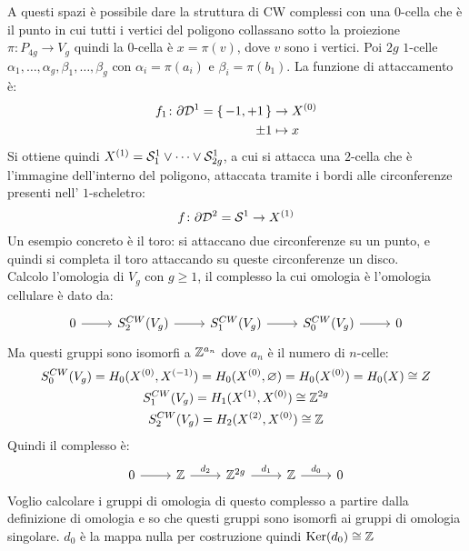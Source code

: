 A questi spazi è possibile dare la struttura di CW complessi
con una $ 0 $-cella che è il punto in cui tutti i vertici del
poligono collassano sotto la proiezione $ \pi \colon P_{4g} \to V_g $
quindi la $ 0 $-cella è $ x = \pi(v) $, dove $ v $ sono i vertici.
Poi $ 2 g $ $ 1 $-celle $ \alpha_1, \dots, \alpha_g, \beta_1, \dots, \beta_g $ con
$ \alpha_i = \pi(a_i) $ e $ \beta_i = \pi(b_1) $. La funzione di attaccamento
è:
\begin{align*}
  f_1 \colon \partial \mathcal{D}^{1} = \set{-1, +1} & \to X^{(0)} \\
  \pm 1 & \mapsto x
\end{align*}
Si ottiene quindi $ X^{(1)} = \mathcal{S}^{1}_1 \vee \dots \vee \mathcal{S}^{1}_{2g} $, a cui si attacca
una $ 2 $-cella che è l'immagine dell'interno del poligono, attaccata tramite
i bordi alle circonferenze presenti nell' $ 1 $-scheletro:
\[
  f \colon \partial \mathcal{D}^{2} = \mathcal{S}^{1} \to X^{(1)}
\]
Un esempio concreto è il toro: si attaccano due circonferenze su un punto, e
quindi si completa il toro attaccando su queste circonferenze un disco. \\
Calcolo l'omologia di $ V_g $ con $ g \geq 1 $, il complesso la cui omologia
è l'omologia cellulare è dato da:
\[
  \begin{tikzcd}
    0 \rar & S^{CW}_2(V_g) \rar & S^{CW}_1(V_g) \rar & S^{CW}_0(V_g) \rar & 0
  \end{tikzcd}
\]
Ma questi gruppi sono isomorfi a $ \mathbb{Z}^{a_n} $ dove $ a_n $ è il numero di
$ n $-celle:
\begin{gather*}
  S^{CW}_0(V_g) = H_0(X^{(0)}, X^{(-1)}) = H_0(X^{(0)}, \varnothing) = H_0(X^{(0)}) = H_0(X) \cong Z \\
  S^{CW}_1(V_g) = H_1(X^{(1)}, X^{(0)}) \cong \mathbb{Z}^{2g} \\
  S^{CW}_2(V_g) = H_2(X^{(2)}, X^{(0)}) \cong \mathbb{Z}
\end{gather*}
Quindi il complesso è:
\[
  \begin{tikzcd}
    0 \rar & \Z \rar{d_2} & \Z^{2g} \rar{d_1} & \Z \rar{d_0} & 0
  \end{tikzcd}
\]
Voglio calcolare i gruppi di omologia di questo complesso a partire dalla
definizione di omologia e so che questi gruppi sono isomorfi ai gruppi di
omologia singolare. $ d_0 $ è la mappa nulla per costruzione quindi
$ \mathrm{Ker}( d_0) \cong \mathbb{Z} $
